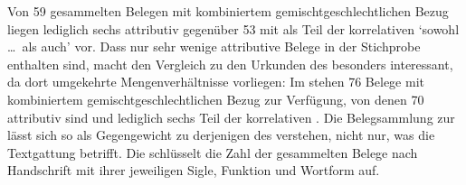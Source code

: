 Von 59 gesammelten Belegen mit kombiniertem gemischtgeschlechtlichen Bezug
liegen lediglich sechs attributiv gegenüber 53 mit 
als Teil der korrelativen   `sowohl
\dots\ als auch' vor. Dass nur sehr wenige attributive Belege in
der Stichprobe enthalten sind, macht den Vergleich zu den Urkunden des \CAO{}
besonders interessant, da dort umgekehrte Mengenverhältnisse vorliegen: Im
\CAO{} stehen 76 Belege mit kombiniertem gemischtgeschlechtlichen Bezug zur
Verfügung, von denen 70 attributiv sind und lediglich sechs Teil
der korrelativen . Die Belegsammlung zur \KC{} lässt sich so
als Gegengewicht zu derjenigen des \CAO{} verstehen, nicht nur, was die
Textgattung betrifft. Die  schlüsselt die Zahl der
gesammelten Belege nach Handschrift mit ihrer jeweiligen Sigle, Funktion und
Wortform auf.

